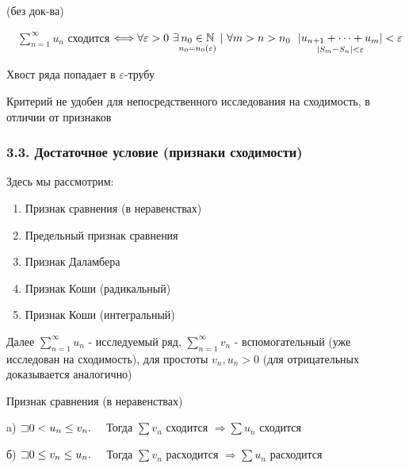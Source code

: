 \documentclass[12pt]{article}
\begin{document}
    \begin{MyTheorem}
        \Ths (без док-ва) 
        
        $\quad \sum_{n = 1}^\infty u_n$ сходится $\Longleftrightarrow \forall \varepsilon > 0 \ \exists \underset{n_0 = n_0 (\varepsilon)}{n_0 \in \mathbb{N}} \ | \ \forall m > n > n_0 \ \ \underset{|S_m - S_n| < \varepsilon}{|u_{n + 1} + \dots + u_m|} < \varepsilon$
    \end{MyTheorem}

    \Nota Хвост ряда попадает в $\varepsilon$-трубу

    \Notas Критерий не удобен для непосредственного исследования на сходимость, в отличии от признаков


    \subsubsection{3.3. Достаточное условие (признаки сходимости)}

    Здесь мы рассмотрим:

    \begin{enumerate}
        \item Признак сравнения (в неравенствах)
        \item Предельный признак сравнения
        \item Признак Даламбера
        \item Признак Коши (радикальный)
        \item Признак Коши (интегральный)
    \end{enumerate}

    Далее $\sum_{n = 1}^\infty u_n$ - исследуемый ряд, $\sum_{n = 1}^\infty v_n$ - вспомогательный (уже исследован на сходимость),
    для простоты $v_n, u_n > 0$ (для отрицательных доказывается аналогично)

    \mediumvspace

    \hypertarget{comparisonsign}{}

    \begin{MyTheorem}
         Признак сравнения (в неравенствах)

        a) $\mathord{\sqsupset} 0 < u_n \leq v_n. \quad$ Тогда $\sum v_n$ сходится $\Longrightarrow \sum u_n$ сходится

        б) $\mathord{\sqsupset} 0 \leq v_n \leq u_n. \quad$ Тогда $\sum v_n$ расходится $\Longrightarrow \sum u_n$ расходится
    \end{MyTheorem}
\end{document}
